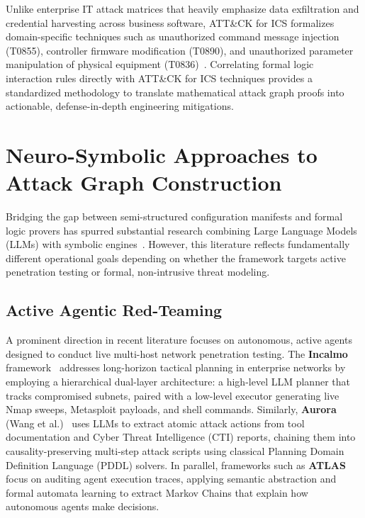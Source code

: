 \documentclass[target=mst,aauheader=aics,style=]{thud}
\begin{document}
Unlike enterprise IT attack matrices that heavily emphasize data exfiltration and credential harvesting across business software, ATT\&CK for ICS formalizes domain-specific techniques such as unauthorized command message injection (T0855), controller firmware modification (T0890), and unauthorized parameter manipulation of physical equipment (T0836)~\cite{mitre2024ics}. Correlating formal logic interaction rules directly with ATT\&CK for ICS techniques provides a standardized methodology to translate mathematical attack graph proofs into actionable, defense-in-depth engineering mitigations.

\section{Neuro-Symbolic Approaches to Attack Graph Construction}
\label{sec:neuro_symbolic_frontiers}

Bridging the gap between semi-structured configuration manifests and formal logic provers has spurred substantial research combining Large Language Models (LLMs) with symbolic engines~\cite{alviano2025llmasp, WachterSurvey}. However, this literature reflects fundamentally different operational goals depending on whether the framework targets active penetration testing or formal, non-intrusive threat modeling.

\subsection{Active Agentic Red-Teaming}
\label{sec:active_agentic_redteaming}
A prominent direction in recent literature focuses on autonomous, active agents designed to conduct live multi-host network penetration testing. The \textbf{Incalmo} framework~\cite{SingerIncalmo} addresses long-horizon tactical planning in enterprise networks by employing a hierarchical dual-layer architecture: a high-level LLM planner that tracks compromised subnets, paired with a low-level executor generating live Nmap sweeps, Metasploit payloads, and shell commands. Similarly, \textbf{Aurora} (Wang et al.)~\cite{WangSandsToMansions} uses LLMs to extract atomic attack actions from tool documentation and Cyber Threat Intelligence (CTI) reports, chaining them into causality-preserving multi-step attack scripts using classical Planning Domain Definition Language (PDDL) solvers. In parallel, frameworks such as \textbf{ATLAS}~\cite{ATLASAgent} focus on auditing agent execution traces, applying semantic abstraction and formal automata learning to extract Markov Chains that explain how autonomous agents make decisions.
\end{document}
